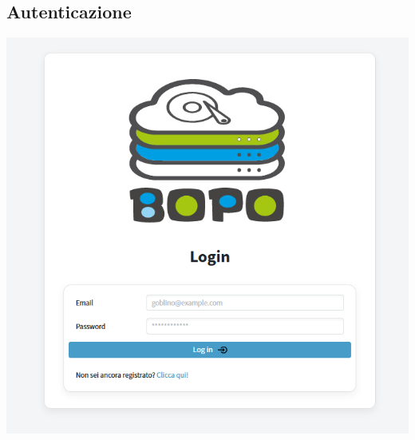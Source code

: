 \subsection*{Autenticazione}
{}

\vspace{3cm}

\begin{adjustwidth}{-0.5cm}{0cm}
\includegraphics[scale=0.8]{figs/login.png}
\end{adjustwidth}
\pagecolor{background}\afterpage{\nopagecolor}



